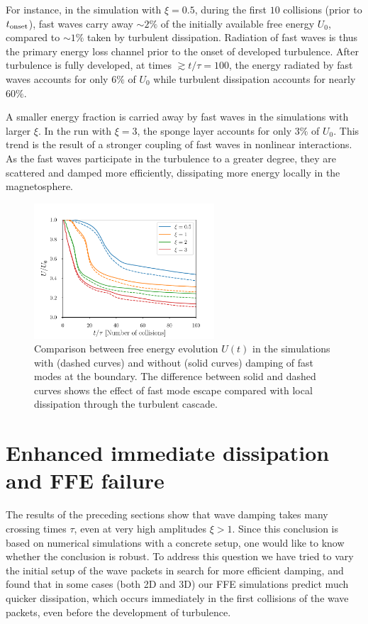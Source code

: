 For instance, in the simulation with $\xi = 0.5$, during the first $10$ collisions (prior to $t_{\rm onset}$), fast waves carry away $\sim 2\%$ of the initially available free energy $U_0$, compared to $\sim 1\%$ taken by turbulent dissipation.
Radiation of fast waves is thus the primary energy loss channel prior to the onset of developed turbulence. After turbulence is fully developed, at times $\gtrsim t/\tau=100$, 
the energy radiated by fast waves accounts for only $6\%$ of $U_0$ while turbulent dissipation accounts for nearly $60\%$.

A smaller energy fraction is carried away by fast waves in the simulations with larger $\xi$.
In the run with $\xi=3$, the sponge layer accounts for only $3\%$ of $U_0$.
This trend is the result of a stronger coupling of fast waves in nonlinear interactions.
As the fast waves participate in the turbulence to a greater degree, they are scattered and damped more efficiently, dissipating more energy locally in the magnetosphere.
%
\begin{figure}[h]
\centering
\includegraphics[width=0.6\textwidth]{pics/chap4/casrate3Dohm}
\caption[Comparison between free energy evolution $U(t)$ in the simulations with and without damping of fast modes]{Comparison between free energy evolution $U(t)$ in the simulations with (dashed curves) and without (solid curves) damping of fast modes at the boundary. 
The difference between solid and dashed curves shows the effect of fast mode escape compared with local dissipation through the turbulent cascade.
}
\label{3Dfastwave}
\end{figure}
%

\section{Enhanced immediate dissipation and FFE failure}
\label{sec:breakffe}
%

The results of the preceding sections show that wave damping takes many crossing times $\tau$, even at very high amplitudes $\xi>1$. Since this conclusion is based on numerical simulations with a concrete setup, one would like to know whether the conclusion is robust. To address this question we have tried to vary the initial setup of the \alfven wave packets in search for more efficient damping, and found that in some cases (both 2D and 3D) our FFE simulations predict much quicker dissipation, which occurs immediately in the first collisions of the wave packets, even before the development of turbulence.

